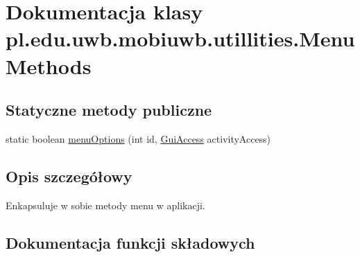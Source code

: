 \hypertarget{classpl_1_1edu_1_1uwb_1_1mobiuwb_1_1utillities_1_1_menu_methods}{}\section{Dokumentacja klasy pl.\+edu.\+uwb.\+mobiuwb.\+utillities.\+Menu\+Methods}
\label{classpl_1_1edu_1_1uwb_1_1mobiuwb_1_1utillities_1_1_menu_methods}
\subsection*{Statyczne metody publiczne}
\begin{DoxyCompactItemize}
\item 
static boolean \hyperlink{classpl_1_1edu_1_1uwb_1_1mobiuwb_1_1utillities_1_1_menu_methods_afec99b378e8363082bc8a2ba6fe73fe4}{menu\+Options} (int id, \hyperlink{interfacepl_1_1edu_1_1uwb_1_1mobiuwb_1_1view_1_1interfaces_1_1_gui_access}{Gui\+Access} activity\+Access)
\end{DoxyCompactItemize}


\subsection{Opis szczegółowy}
Enkapsuluje w sobie metody menu w aplikacji. 

\subsection{Dokumentacja funkcji składowych}
\hypertarget{classpl_1_1edu_1_1uwb_1_1mobiuwb_1_1utillities_1_1_menu_methods_afec99b378e8363082bc8a2ba6fe73fe4}{}
